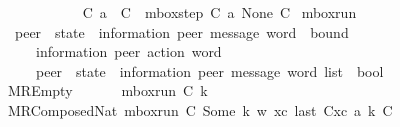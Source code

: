 \begin{isabellebody}
\ \ {\isacharparenleft}{\kern0pt}{\isachardoublequoteopen}{\isacharunderscore}{\kern0pt}\ {\isasymmidarrow}{\isasymlangle}{\isacharunderscore}{\kern0pt}{\isacharcomma}{\kern0pt}\ {\isasyminfinity}{\isasymrangle}{\isasymrightarrow}\ {\isacharunderscore}{\kern0pt}{\isachardoublequoteclose}\ {\isacharbrackleft}{\kern0pt}{}{}{\isacharcomma}{\kern0pt}\ {}{}{\isacharcomma}{\kern0pt}\ {}{}{\isacharbrackright}{\kern0pt}\ {}{}{}{\isacharparenright}{\kern0pt}\ \isanewline
\ \ {\isachardoublequoteopen}C{}\ {\isasymmidarrow}{\isasymlangle}a{\isacharcomma}{\kern0pt}\ {\isasyminfinity}{\isasymrangle}{\isasymrightarrow}\ C{}\ {\isasymequiv}\ mbox{\isacharunderscore}{\kern0pt}step\ C{}\ a\ None\ C{}{\isachardoublequoteclose}\isanewline
\isanewline
{}\isamarkupfalse%
\ mbox{\isacharunderscore}{\kern0pt}run\isanewline
\ \ {\isacharcolon}{\kern0pt}{\isacharcolon}{\kern0pt}\ {\isachardoublequoteopen}{\isacharparenleft}{\kern0pt}{\isacharprime}{\kern0pt}peer\ {\isasymRightarrow}\ {\isacharparenleft}{\kern0pt}{\isacharprime}{\kern0pt}state\ {\isasymtimes}\ {\isacharparenleft}{\kern0pt}{\isacharprime}{\kern0pt}information{\isacharcomma}{\kern0pt}\ {\isacharprime}{\kern0pt}peer{\isacharparenright}{\kern0pt}\ message\ word{\isacharparenright}{\kern0pt}{\isacharparenright}{\kern0pt}\ {\isasymRightarrow}\ bound\ {\isasymRightarrow}\isanewline
\ \ \ \ \ \ {\isacharparenleft}{\kern0pt}{\isacharprime}{\kern0pt}information{\isacharcomma}{\kern0pt}\ {\isacharprime}{\kern0pt}peer{\isacharparenright}{\kern0pt}\ action\ word\ {\isasymRightarrow}\isanewline
\ \ \ \ \ \ {\isacharparenleft}{\kern0pt}{\isacharprime}{\kern0pt}peer\ {\isasymRightarrow}\ {\isacharparenleft}{\kern0pt}{\isacharprime}{\kern0pt}state\ {\isasymtimes}\ {\isacharparenleft}{\kern0pt}{\isacharprime}{\kern0pt}information{\isacharcomma}{\kern0pt}\ {\isacharprime}{\kern0pt}peer{\isacharparenright}{\kern0pt}\ message\ word{\isacharparenright}{\kern0pt}{\isacharparenright}{\kern0pt}\ list\ {\isasymRightarrow}\ bool{\isachardoublequoteclose}\ \isanewline
\ \ MREmpty{\isacharcolon}{\kern0pt}\ \ \ \ \ \ \ {\isachardoublequoteopen}mbox{\isacharunderscore}{\kern0pt}run\ C\ k\ {\isasymepsilon}\ {\isacharparenleft}{\kern0pt}{\isacharbrackleft}{\kern0pt}{\isacharbrackright}{\kern0pt}{\isacharparenright}{\kern0pt}{\isachardoublequoteclose}\ {\isacharbar}{\kern0pt}\isanewline
\ \ MRComposedNat{\isacharcolon}{\kern0pt}\ {\isachardoublequoteopen}{\isasymlbrakk}mbox{\isacharunderscore}{\kern0pt}run\ C{}\ {\isacharparenleft}{\kern0pt}Some\ k{\isacharparenright}{\kern0pt}\ w\ xc{\isacharsemicolon}{\kern0pt}\ last\ {\isacharparenleft}{\kern0pt}C{}{\isacharhash}{\kern0pt}xc{\isacharparenright}{\kern0pt}\ {\isasymmidarrow}{\isasymlangle}a{\isacharcomma}{\kern0pt}\ k{\isasymrangle}{\isasymrightarrow}\ C{\isasymrbrakk}\ {\isasymLongrightarrow}\isanewline

\end{isabellebody}
